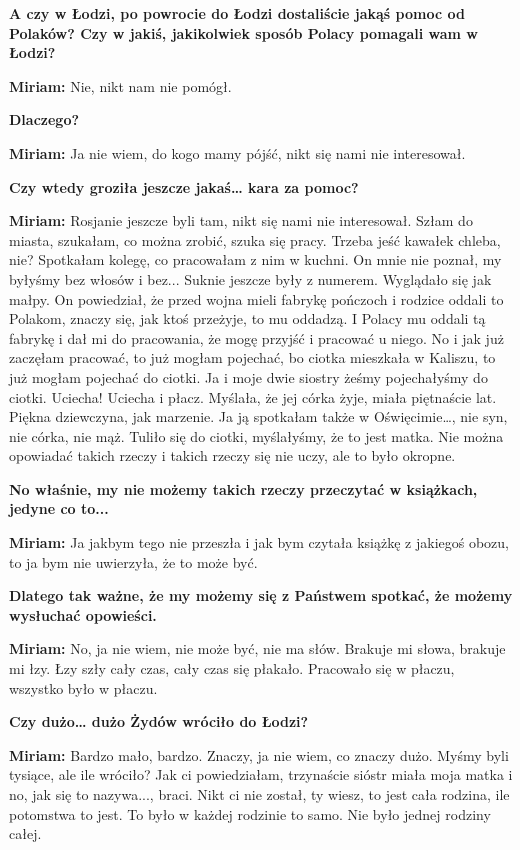 \textbf{A czy w Łodzi, po powrocie do Łodzi dostaliście jakąś pomoc od Polaków? Czy w jakiś, jakikolwiek sposób Polacy pomagali wam w Łodzi?} 

\textbf{Miriam:} Nie, nikt nam nie pomógł. 

\textbf{Dlaczego?} 

\textbf{Miriam:} Ja nie wiem, do kogo mamy pójść, nikt się nami nie interesował. 

\textbf{Czy wtedy groziła jeszcze jakaś… kara za pomoc?} 

\textbf{Miriam:} Rosjanie jeszcze byli tam, nikt się nami nie interesował. Szłam do miasta, szukałam, co można zrobić, szuka się pracy. Trzeba jeść kawałek chleba, nie? Spotkałam kolegę, co pracowałam z nim w kuchni. On mnie nie poznał, my byłyśmy bez włosów i bez... Suknie jeszcze były z numerem. Wyglądało się jak małpy. On powiedział, że przed wojna mieli fabrykę pończoch i rodzice oddali to Polakom, znaczy się, jak ktoś przeżyje, to mu oddadzą. I Polacy mu oddali tą fabrykę i dał mi do pracowania, że mogę przyjść i pracować u niego. No i jak już zaczęłam pracować, to już mogłam pojechać, bo ciotka mieszkała w Kaliszu, to już mogłam pojechać do ciotki. Ja i moje dwie siostry żeśmy pojechałyśmy do ciotki. Uciecha! Uciecha i płacz. Myślała, że jej córka żyje, miała piętnaście lat. Piękna dziewczyna, jak marzenie. Ja ją spotkałam także w Oświęcimie…, nie syn, nie córka, nie mąż. Tuliło się do ciotki, myślałyśmy, że to jest matka. Nie można opowiadać takich rzeczy i takich rzeczy się nie uczy, ale to było okropne. 

\textbf{No właśnie, my nie możemy takich rzeczy przeczytać w książkach, jedyne co to...} 

\textbf{Miriam:} Ja jakbym tego nie przeszła i jak bym czytała książkę z jakiegoś obozu, to ja bym nie uwierzyła, że to może być. 

\textbf{Dlatego tak ważne, że my możemy się z Państwem spotkać, że możemy wysłuchać opowieści.} 

\textbf{Miriam:} No, ja nie wiem, nie może być, nie ma słów. Brakuje mi słowa, brakuje mi łzy. Łzy szły cały czas, cały czas się płakało. Pracowało się w płaczu, wszystko było w płaczu. 

\textbf{Czy dużo… dużo Żydów wróciło do Łodzi?} 

\textbf{Miriam:} Bardzo mało, bardzo. Znaczy, ja nie wiem, co znaczy dużo. Myśmy byli tysiące, ale ile wróciło? Jak ci powiedziałam, trzynaście sióstr miała moja matka i no, jak się to nazywa..., braci. Nikt ci nie został, ty wiesz, to jest cała rodzina, ile potomstwa to jest. To było w każdej rodzinie to samo. Nie było jednej rodziny całej. 

